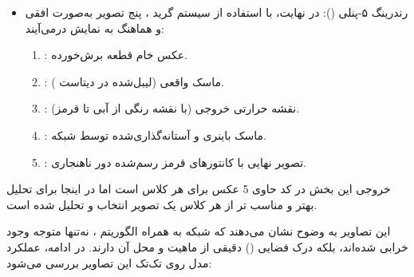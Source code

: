 \documentclass{article}
\begin{document}
\begin{itemize}
	\item رندرینگ ۵-پنلی ():
	در نهایت، با استفاده از سیستم گرید ، پنج تصویر به‌صورت افقی و هماهنگ به نمایش درمی‌آیند:
	\begin{enumerate}
		\item {}: عکس خام قطعه برش‌خورده.
		\item {}: ماسک واقعی (لیبل‌شده در دیتاست ).
		\item {}: نقشه حرارتی خروجی  (با نقشه رنگی  از آبی تا قرمز).
		\item {}: ماسک باینری و آستانه‌گذاری‌شده توسط شبکه.
		\item {}: تصویر نهایی با کانتورهای قرمز رسم‌شده دور ناهنجاری.
	\end{enumerate}
\end{itemize}

خروجی این بخش در کد حاوی 5 عکس برای هر کلاس است اما در اینجا برای تحلیل بهتر و مناسب تر از هر کلاس یک تصویر انتخاب و تحلیل شده است.


این تصاویر به وضوح نشان می‌دهند که شبکه  به همراه الگوریتم ، نه‌تنها متوجه وجود خرابی شده‌اند، بلکه درک فضایی () دقیقی از ماهیت و محل آن دارند. در ادامه، عملکرد مدل روی تک‌تک این تصاویر بررسی می‌شود:
\end{document}
